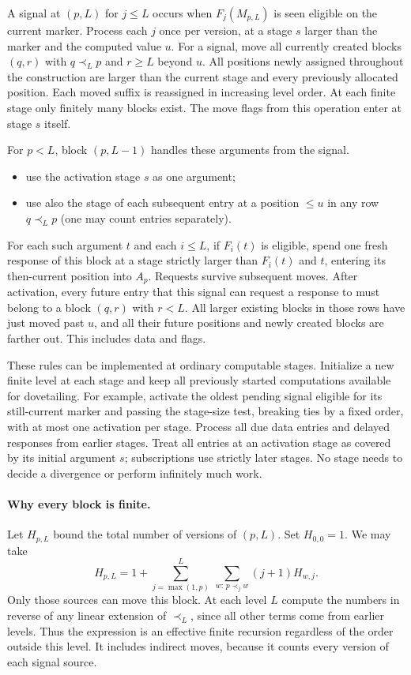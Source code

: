 \documentclass[11pt]{article}
\begin{document}
A signal at $(p,L)$ for $j\le L$ occurs when $F_j(M_{p,L})$ is seen eligible on the current marker. Process each $j$ once per version, at a stage $s$ larger than the marker and the computed value $u$. For a signal, move all currently created blocks $(q,r)$ with $q\prec_L p$ and $r\ge L$ beyond $u$. All positions newly assigned throughout the construction are larger than the current stage and every previously allocated position. Each moved suffix is reassigned in increasing level order. At each finite stage only finitely many blocks exist. The move flags from this operation enter at stage $s$ itself.

For $p<L$, block $(p,L-1)$ handles these arguments from the signal.
\begin{itemize}
\item use the activation stage $s$ as one argument;
\item use also the stage of each subsequent entry at a position $\le u$ in any row $q\prec_L p$ (one may count entries separately).
\end{itemize}
For each such argument $t$ and each $i\le L$, if $F_i(t)$ is eligible, spend one fresh response of this block at a stage strictly larger than $F_i(t)$ and $t$, entering its then-current position into $A_p$. Requests survive subsequent moves. After activation, every future entry that this signal can request a response to must belong to a block $(q,r)$ with $r<L$. All larger existing blocks in those rows have just moved past $u$, and all their future positions and newly created blocks are farther out. This includes data and flags.

These rules can be implemented at ordinary computable stages. Initialize a new finite level at each stage and keep all previously started computations available for dovetailing. For example, activate the oldest pending signal eligible for its still-current marker and passing the stage-size test, breaking ties by a fixed order, with at most one activation per stage. Process all due data entries and delayed responses from earlier stages. Treat all entries at an activation stage as covered by its initial argument $s$; subscriptions use strictly later stages. No stage needs to decide a divergence or perform infinitely much work.

\paragraph{Why every block is finite.}
Let $H_{p,L}$ bound the total number of versions of $(p,L)$. Set $H_{0,0}=1$. We may take
\[
 H_{p,L}=1+\sum_{j=\max(1,p)}^{L}
          \ \sum_{w:\,p\prec_j w}(j+1) H_{w,j}.
\]
Only those sources can move this block. At each level $L$ compute the numbers in reverse of any linear extension of $\prec_L$, since all other terms come from earlier levels. Thus the expression is an effective finite recursion regardless of the order outside this level. It includes indirect moves, because it counts every version of each signal source.
\end{document}
